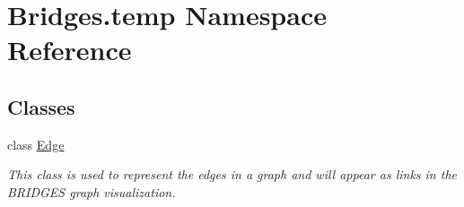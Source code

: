\hypertarget{namespace_bridges_1_1temp}{}\section{Bridges.\+temp Namespace Reference}
\label{namespace_bridges_1_1temp}
\subsection*{Classes}
\begin{DoxyCompactItemize}
\item 
class \mbox{\hyperlink{class_bridges_1_1temp_1_1_edge}{Edge}}
\begin{DoxyCompactList}\small\item\em This class is used to represent the edges in a graph and will appear as links in the B\+R\+I\+D\+G\+ES graph visualization. \end{DoxyCompactList}\end{DoxyCompactItemize}
